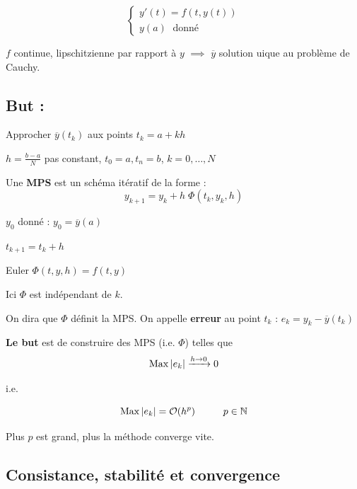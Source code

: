 \vspace{-0.5cm}

\begin{equation*}
    \left\lbrace
    \begin{array}{c}
        y'(t) = f(t,y(t)) \\
        y(a) \; \text{ donné}
    \end{array}\right.
\end{equation*}

$f$ continue, lipschitzienne par rapport à $y$ $\implies$ $\overline{y}$ solution uique au problème de Cauchy.

\subsection*{But :}
Approcher $\overline{y}(t_k)$ aux points $t_k = a + kh$

$h=\displaystyle\frac{b-a}{N}$ pas constant, $t_0=a, t_n=b$, $k=0,\dots,N$

\begin{fdef}[MPS]
    Une \textbf{MPS} est un schéma itératif de la forme :
    \[
        y_{k+1} = y_k + h \; \Phi(t_k,y_k,h)
    \]

    $y_0$ donné : $y_0 = \overline{y}(a)$

    $t_{k+1} = t_k + h$
\end{fdef}

\begin{exemple}
    Euler $\Phi(t,y,h) = f(t,y)$

    Ici $\Phi$ est indépendant de $k$.

    On dira que $\Phi$ définit la MPS.
    On appelle \textbf{erreur} au point $t_k$ : $e_k = y_k - \overline{y}(t_k)$

    \textbf{Le but} est de construire des MPS (i.e. $\Phi$) telles que 
    \[
        \operatorname{Max} \left\lvert e_k\right\rvert \xrightarrow{h\to0} 0
    \]
    \begin{center}
        i.e.
    \end{center}
    \[
        \operatorname{Max} \left\lvert e_k\right\rvert = \mathcal{O} (h^p) \hspace{1cm} p\in\mathbb{N}
    \]

    Plus $p$ est grand, plus la méthode converge vite.
\end{exemple}

\subsection{Consistance, stabilité et convergence}

